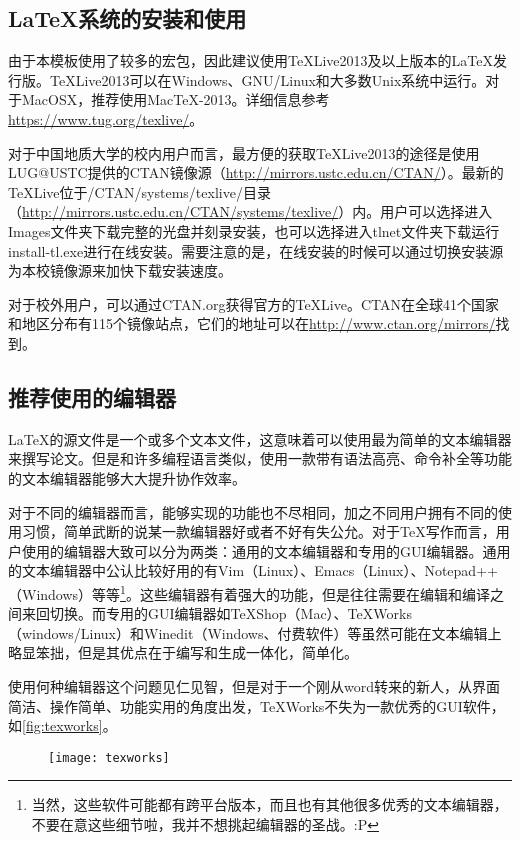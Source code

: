 \subsection{\texorpdfstring{\LaTeX}{LaTeX}系统的安装和使用}
由于本模板使用了较多的宏包，因此建议使用TeXLive2013及以上版本的\LaTeX 发行版。TeXLive2013可以在Windows、GNU/Linux和大多数Unix系统中运行。对于MacOSX，推荐使用MacTeX-2013。详细信息参考\url{https://www.tug.org/texlive/}。

对于中国地质大学的校内用户而言，最方便的获取TeXLive2013的途径是使用LUG@USTC提供的CTAN镜像源（\url{http://mirrors.ustc.edu.cn/CTAN/}）。最新的TeXLive位于/CTAN/systems/texlive/目录（\url{http://mirrors.ustc.edu.cn/CTAN/systems/texlive/}）内。用户可以选择进入Images文件夹下载完整的光盘并刻录安装，也可以选择进入tlnet文件夹下载运行install-tl.exe进行在线安装。需要注意的是，在线安装的时候可以通过切换安装源为本校镜像源来加快下载安装速度。

对于校外用户，可以通过CTAN.org获得官方的TeXLive。CTAN在全球41个国家和地区分布有115个镜像站点，它们的地址可以在\url{http://www.ctan.org/mirrors/}找到。

\subsection{推荐使用的编辑器}
\LaTeX 的源文件是一个或多个文本文件，这意味着可以使用最为简单的文本编辑器来撰写论文。但是和许多编程语言类似，使用一款带有语法高亮、命令补全等功能的文本编辑器能够大大提升协作效率。

对于不同的编辑器而言，能够实现的功能也不尽相同，加之不同用户拥有不同的使用习惯，简单武断的说某一款编辑器好或者不好有失公允。对于\TeX 写作而言，用户使用的编辑器大致可以分为两类：通用的文本编辑器和专用的GUI编辑器。通用的文本编辑器中公认比较好用的有Vim（Linux）、Emacs（Linux）、Notepad++（Windows）等等\footnote{当然，这些软件可能都有跨平台版本，而且也有其他很多优秀的文本编辑器，不要在意这些细节啦，我并不想挑起编辑器的圣战。:P}。这些编辑器有着强大的功能，但是往往需要在编辑和编译之间来回切换。而专用的GUI编辑器如TeXShop（Mac）、TeXWorks（windows/Linux）和Winedit（Windows、付费软件）等虽然可能在文本编辑上略显笨拙，但是其优点在于编写和生成一体化，简单化。

使用何种编辑器这个问题见仁见智，但是对于一个刚从word转来的新人，从界面简洁、操作简单、功能实用的角度出发，TeXWorks不失为一款优秀的GUI软件，如\autoref{fig:texworks}。

\begin{figure}
\centering
\texttt{[image: texworks]}
\label{fig:texworks}
\end{figure}

